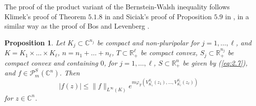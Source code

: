 \documentclass[a4paper,12pt,leqno,english]{article}
\numberwithin{equation}{section}
\newtheorem{proposition+}  [theorem+]  {Proposition}
\newenvironment{proposition}{\begin{proposition+}\sl}{\end{proposition+}\rm}
\begin{document}
The proof of the product variant of the Bernstein-Walsh inequality follows Klimek's proof of Theorem $5.1.8$ in \cite{Kli:1991}
    and Siciak's proof of Proposition $5.9$ in \cite{Sic:1981},
    in a similar way as the proof of Bos and Levenberg \cite{BosLev:2018}.
\begin{proposition}
\label{main:prop.1}
Let 
    $K_j \subset \mathbb{C}^{n_j}$ be compact and non-pluripolar for $j = 1, \dots, \ell$, and
    $K = K_1 \times \dots \times K_\ell$,
    $n = n_1 + \dots + n_\ell$,
    $T \subset \mathbb{R}_+^\ell$ be compact convex,
    $S_j \subset \mathbb{R}_+^{n_j}$ be compact convex and containing $0$, for $j = 1, \dots, \ell$,
    $S \subset \mathbb{R}_+^n$ be given by (\ref{eq:2.7}), and
    $f \in \mathcal{P}^S_m(\mathbb{C}^n)$.
Then
\begin{equation*}
    |f(z)|
    \leq
    \|f\|_{L^\infty(K)}
        e^{m\varphi_T(V^{S_1}_{K_1}(z_1), \dots, V^{S_\ell}_{K_\ell}(z_\ell))}
\end{equation*}
for $z \in \mathbb{C}^n$.
\end{proposition}
\end{document}
